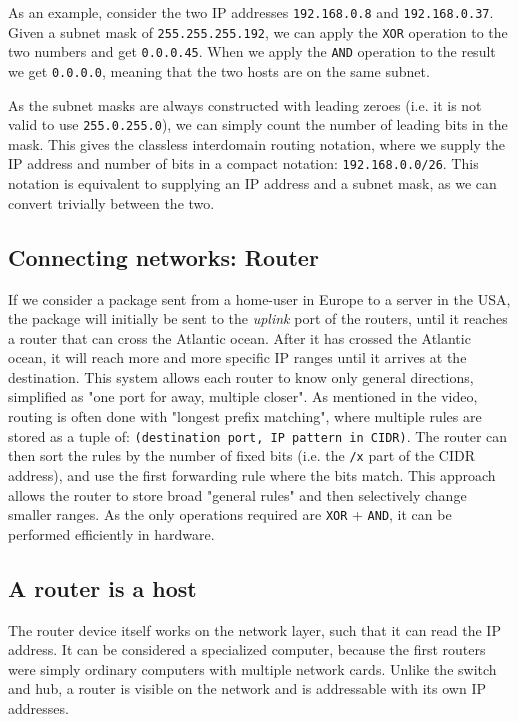 As an example, consider the two IP addresses \texttt{192.168.0.8} and \texttt{192.168.0.37}. Given a subnet mask of \texttt{255.255.255.192}, we can apply the \texttt{XOR} operation to the two numbers and get \texttt{0.0.0.45}. When we apply the \texttt{AND} operation to the result we get \texttt{0.0.0.0}, meaning that the two hosts are on the same subnet.

As the subnet masks are always constructed with leading zeroes (i.e. it is not valid to use \texttt{255.0.255.0}), we can simply count the number of leading bits in the mask. This gives the classless interdomain routing notation, where we supply the IP address and number of bits in a compact notation: \texttt{192.168.0.0/26}. This notation is equivalent to supplying an IP address and a subnet mask, as we can convert trivially between the two.

\subsection{Connecting networks: Router}
If we consider a package sent from a home-user in Europe to a server in the USA, the package will initially be sent to the \emph{uplink} port of the routers, until it reaches a router that can cross the Atlantic ocean. After it has crossed the Atlantic ocean, it will reach more and more specific IP ranges until it arrives at the destination. This system allows each router to know only general directions, simplified as "one port for away, multiple closer". As mentioned in the video, routing is often done with "longest prefix matching", where multiple rules are stored as a tuple of: \texttt{(destination port, IP pattern in CIDR)}. The router can then sort the rules by the number of fixed bits (i.e. the \texttt{/x} part of the CIDR address), and use the first forwarding rule where the bits match. This approach allows the router to store broad "general rules" and then selectively change smaller ranges. As the only operations required are \texttt{XOR} + \texttt{AND}, it can be performed efficiently in hardware.

\subsection{A router is a host}
The router device itself works on the network layer, such that it can read the IP address. It can be considered a specialized computer, because the first routers were simply ordinary computers with multiple network cards. Unlike the switch and hub, a router is visible on the network and is addressable with its own IP addresses.

